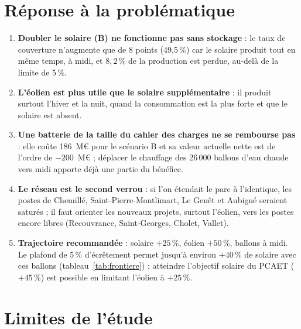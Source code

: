 \documentclass[11pt, a4paper]{report}
\newcommand{\pct}{\,\%}
\begin{document}
\section*{Réponse à la problématique}

\begin{enumerate}
  \item \textbf{Doubler le solaire (B) ne fonctionne pas sans stockage} : le taux de couverture n'augmente que de 8 points (49,5\pct) car le solaire produit tout en même temps, à midi, et $8{,}2\pct$ de la production est perdue, au-delà de la limite de 5\pct.
  \item \textbf{L'éolien est plus utile que le solaire supplémentaire} : il produit surtout l'hiver et la nuit, quand la consommation est la plus forte et que le solaire est absent.
  \item \textbf{Une batterie de la taille du cahier des charges ne se rembourse pas} : elle coûte 186~M\euro{} pour le scénario B et sa valeur actuelle nette est de l'ordre de $-200$~M\euro{} ; déplacer le chauffage des 26\,000 ballons d'eau chaude vers midi apporte déjà une partie du bénéfice.
  \item \textbf{Le réseau est le second verrou} : si l'on étendait le parc à l'identique, les postes de Chemillé, Saint-Pierre-Montlimart, Le Genêt et Aubigné seraient saturés ; il faut orienter les nouveaux projets, surtout l'éolien, vers les postes encore libres (Recouvrance, Saint-Georges, Cholet, Vallet).
  \item \textbf{Trajectoire recommandée} : solaire $+25\pct$, éolien $+50\pct$, ballons à midi. Le plafond de 5\pct{} d'écrêtement permet jusqu'à environ $+40\pct$ de solaire avec ces ballons (tableau~\ref{tab:frontiere}) ; atteindre l'objectif solaire du PCAET ($+45\pct$) est possible en limitant l'éolien à $+25\pct$.
\end{enumerate}

\section*{Limites de l'étude}
\end{document}
